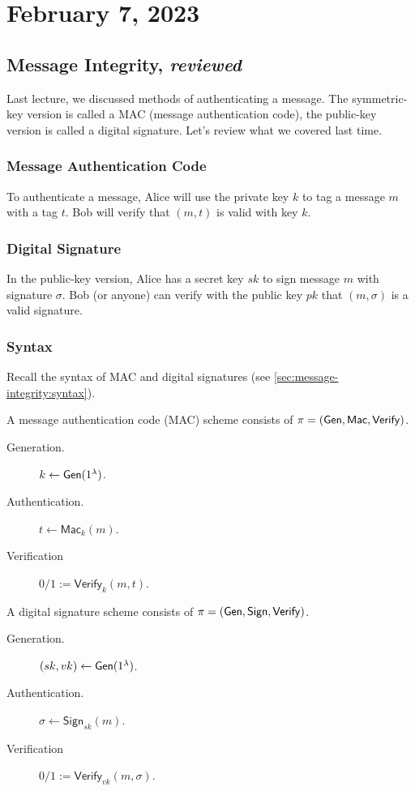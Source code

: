\section{February 7, 2023}
\label{20230207}
\subsection{Message Integrity, \emph{reviewed}}

Last lecture, we discussed methods of authenticating a message. The symmetric-key version is called a MAC (message authentication code), the public-key version is called a digital signature. Let's review what we covered last time.

\subsubsection{Message Authentication Code}
To authenticate a message, Alice will use the private key $k$ to tag a message $m$ with a tag $t$. Bob will verify that $(m, t)$ is valid with key $k$.


\subsubsection{Digital Signature}
In the public-key version, Alice has a secret key $sk$ to sign message $m$ with signature $\sigma$. Bob (or anyone) can verify with the public key $pk$ that $(m, \sigma)$ is a valid signature.


\subsubsection{Syntax}
Recall the syntax of MAC and digital signatures (see \cref{sec:message-integrity:syntax}).

A message authentication code (MAC) scheme consists of $\pi = (\operatorname{\mathsf{Gen}}, \mathsf{Mac}, \mathsf{Verify})$.
\begin{description}
    \item[Generation.] $k\leftarrow \operatorname{\mathsf{Gen}}(1^\lambda)$.
    \item[Authentication.] $t \leftarrow \mathsf{Mac}_k(m)$.
    \item[Verification] $0/1 := \mathsf{Verify}_k(m, t)$.
\end{description}

A digital signature scheme consists of $\pi = (\operatorname{\mathsf{Gen}}, \mathsf{Sign}, \mathsf{Verify})$.
\begin{description}
    \item[Generation.] $(sk, vk)\leftarrow \operatorname{\mathsf{Gen}}(1^\lambda)$.
    \item[Authentication.] $\sigma \leftarrow \mathsf{Sign}_{sk}(m)$.
    \item[Verification] $0/1 := \mathsf{Verify}_{vk}(m, \sigma)$.
\end{description}

